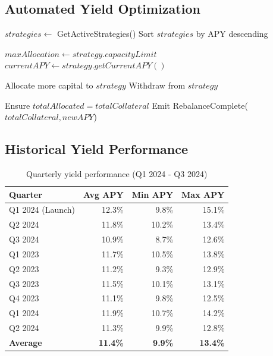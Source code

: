 \documentclass[11pt,a4paper]{article}
\begin{document}
\subsection{Automated Yield Optimization}

\begin{algorithm}[H]
\caption{Dynamic Yield Allocation}
\begin{algorithmic}[1]
    \State $strategies \gets$ GetActiveStrategies()
    \State Sort $strategies$ by APY descending
    
        \State $maxAllocation \gets strategy.capacityLimit$
        \State $currentAPY \gets strategy.getCurrentAPY()$
        
            \State Allocate more capital to $strategy$
            \State Withdraw from $strategy$
        \EndIf
    \EndFor
    
    \State Ensure $totalAllocated = totalCollateral$
    \State Emit RebalanceComplete($totalCollateral, newAPY$)
\EndFunction
\end{algorithmic}
\end{algorithm}

\subsection{Historical Yield Performance}

\begin{table}[h]
\centering
\begin{tabular}{@{}lrrr@{}}
\toprule
\textbf{Quarter} & \textbf{Avg APY} & \textbf{Min APY} & \textbf{Max APY} \\ \midrule
Q1 2024 (Launch) & 12.3\% & 9.8\% & 15.1\% \\
Q2 2024 & 11.8\% & 10.2\% & 13.4\% \\
Q3 2024 & 10.9\% & 8.7\% & 12.6\% \\
Q1 2023 & 11.7\% & 10.5\% & 13.8\% \\
Q2 2023 & 11.2\% & 9.3\% & 12.9\% \\
Q3 2023 & 11.5\% & 10.1\% & 13.1\% \\
Q4 2023 & 11.1\% & 9.8\% & 12.5\% \\
Q1 2024 & 11.9\% & 10.7\% & 14.2\% \\
Q2 2024 & 11.3\% & 9.9\% & 12.8\% \\ \midrule
\textbf{Average} & \textbf{11.4\%} & \textbf{9.9\%} & \textbf{13.4\%} \\ \bottomrule
\end{tabular}
\caption{Quarterly yield performance (Q1 2024 - Q3 2024)}
\end{table}
\end{document}
